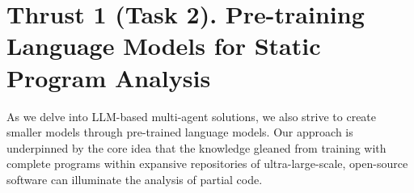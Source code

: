 \section{Thrust 1 (Task 2). Pre-training Language Models for Static Program Analysis}

%

As we delve into LLM-based multi-agent solutions, we also strive to create smaller models through pre-trained language models. Our approach is underpinned by the core idea that the knowledge gleaned from training with complete programs within expansive repositories of ultra-large-scale, open-source software can illuminate the analysis of partial code.


